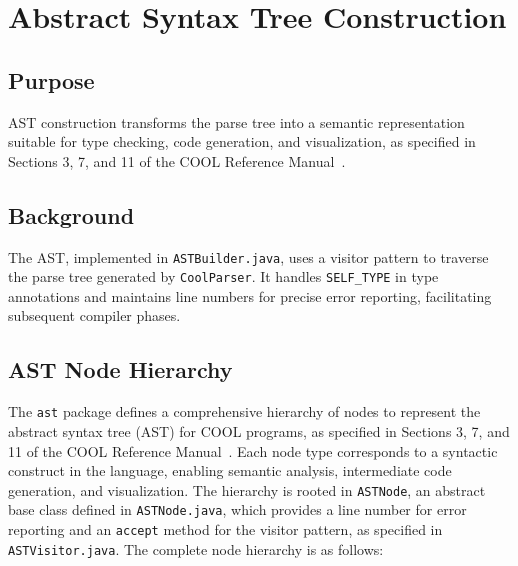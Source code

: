 \documentclass[11pt, titlepage]{article}
\begin{document}
\section{Abstract Syntax Tree Construction}
\label{sec:ast}

\subsection{Purpose}
AST construction transforms the parse tree into a semantic representation suitable for type checking, code generation, and visualization, as specified in Sections 3, 7, and 11 of the COOL Reference Manual~\cite{cool_manual}.

\subsection{Background}
The AST, implemented in \texttt{ASTBuilder.java}, uses a visitor pattern to traverse the parse tree generated by \texttt{CoolParser}. It handles \texttt{SELF\_TYPE} in type annotations and maintains line numbers for precise error reporting, facilitating subsequent compiler phases.

\subsection{AST Node Hierarchy}
The \texttt{ast} package defines a comprehensive hierarchy of nodes to represent the abstract syntax tree (AST) for COOL programs, as specified in Sections 3, 7, and 11 of the COOL Reference Manual~\cite{cool_manual}. Each node type corresponds to a syntactic construct in the language, enabling semantic analysis, intermediate code generation, and visualization. The hierarchy is rooted in \texttt{ASTNode}, an abstract base class defined in \texttt{ASTNode.java}, which provides a line number for error reporting and an \texttt{accept} method for the visitor pattern, as specified in \texttt{ASTVisitor.java}. The complete node hierarchy is as follows:
\end{document}
